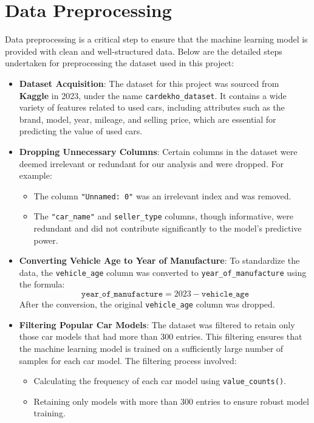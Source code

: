 \documentclass[a4paper,12pt]{article}
\begin{document}
\section{Data Preprocessing}
\begin{justify}
	Data preprocessing is a critical step to ensure that the machine learning model is provided with clean and well-structured data. Below are the detailed steps undertaken for preprocessing the dataset used in this project:
	
	\begin{itemize}
		\item \textbf{Dataset Acquisition}: The dataset for this project was sourced from \textbf{Kaggle} in 2023, under the name \texttt{cardekho\_dataset}. It contains a wide variety of features related to used cars, including attributes such as the brand, model, year, mileage, and selling price, which are essential for predicting the value of used cars.
		
		\item \textbf{Dropping Unnecessary Columns}: Certain columns in the dataset were deemed irrelevant or redundant for our analysis and were dropped. For example:
		\begin{itemize}
			\item The column \texttt{"Unnamed: 0"} was an irrelevant index and was removed.
			\item The \texttt{"car\_name"} and \texttt{seller\_type} columns, though informative, were redundant and did not contribute significantly to the model's predictive power.
		\end{itemize}
		
		\item \textbf{Converting Vehicle Age to Year of Manufacture}: To standardize the data, the \texttt{vehicle\_age} column was converted to \texttt{year\_of\_manufacture} using the formula:
		\[
		\texttt{year\_of\_manufacture} = 2023 - \texttt{vehicle\_age}
		\]
		After the conversion, the original \texttt{vehicle\_age} column was dropped.
		
		\item \textbf{Filtering Popular Car Models}: The dataset was filtered to retain only those car models that had more than 300 entries. This filtering ensures that the machine learning model is trained on a sufficiently large number of samples for each car model. The filtering process involved:
		\begin{itemize}
			\item Calculating the frequency of each car model using \texttt{value\_counts()}.
			\item Retaining only models with more than 300 entries to ensure robust model training.
		\end{itemize}
		

\end{itemize}
\end{justify}
\end{document}
